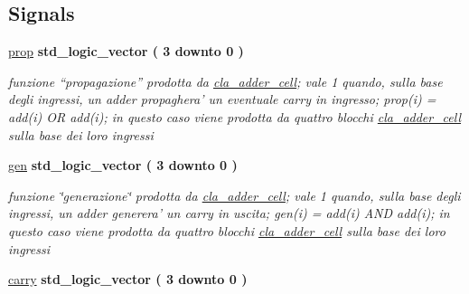 \subsection*{Signals}
 \begin{DoxyCompactItemize}
\item 
\hyperlink{group___nibble_adder_ga3abd8d433ff039baabc0c6fc2126578b}{prop} {\bfseries \textcolor{vhdlchar}{std\+\_\+logic\+\_\+vector}\textcolor{vhdlchar}{ }\textcolor{vhdlchar}{(}\textcolor{vhdlchar}{ }\textcolor{vhdlchar}{ } \textcolor{vhdldigit}{3} \textcolor{vhdlchar}{ }\textcolor{vhdlchar}{downto}\textcolor{vhdlchar}{ }\textcolor{vhdlchar}{ } \textcolor{vhdldigit}{0} \textcolor{vhdlchar}{ }\textcolor{vhdlchar}{)}\textcolor{vhdlchar}{ }} 
\begin{DoxyCompactList}\small\item\em funzione “propagazione” prodotta da \hyperlink{classcla__adder__cell}{cla\+\_\+adder\+\_\+cell}; vale 1 quando, sulla base degli ingressi, un adder propaghera' un eventuale carry in ingresso; prop(i) = add(i) O\+R add(i); in questo caso viene prodotta da quattro blocchi \hyperlink{classcla__adder__cell}{cla\+\_\+adder\+\_\+cell} sulla base dei loro ingressi \end{DoxyCompactList}\item 
\hyperlink{group___nibble_adder_gac6c069fe4ec1c0a42272d3de4be6f45f}{gen} {\bfseries \textcolor{vhdlchar}{std\+\_\+logic\+\_\+vector}\textcolor{vhdlchar}{ }\textcolor{vhdlchar}{(}\textcolor{vhdlchar}{ }\textcolor{vhdlchar}{ } \textcolor{vhdldigit}{3} \textcolor{vhdlchar}{ }\textcolor{vhdlchar}{downto}\textcolor{vhdlchar}{ }\textcolor{vhdlchar}{ } \textcolor{vhdldigit}{0} \textcolor{vhdlchar}{ }\textcolor{vhdlchar}{)}\textcolor{vhdlchar}{ }} 
\begin{DoxyCompactList}\small\item\em funzione \char`\"{}generazione\char`\"{} prodotta da \hyperlink{classcla__adder__cell}{cla\+\_\+adder\+\_\+cell}; vale 1 quando, sulla base degli ingressi, un adder generera' un carry in uscita; gen(i) = add(i) A\+N\+D add(i); in questo caso viene prodotta da quattro blocchi \hyperlink{classcla__adder__cell}{cla\+\_\+adder\+\_\+cell} sulla base dei loro ingressi \end{DoxyCompactList}\item 
\hyperlink{group___nibble_adder_ga8f5524d80e551d479327a16bb32abcaa}{carry} {\bfseries \textcolor{vhdlchar}{std\+\_\+logic\+\_\+vector}\textcolor{vhdlchar}{ }\textcolor{vhdlchar}{(}\textcolor{vhdlchar}{ }\textcolor{vhdlchar}{ } \textcolor{vhdldigit}{3} \textcolor{vhdlchar}{ }\textcolor{vhdlchar}{downto}\textcolor{vhdlchar}{ }\textcolor{vhdlchar}{ } \textcolor{vhdldigit}{0} \textcolor{vhdlchar}{ }\textcolor{vhdlchar}{)}\textcolor{vhdlchar}{ }} 

\end{DoxyCompactItemize}
